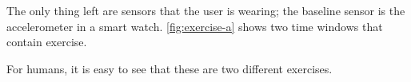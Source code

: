The only thing left are sensors that the user is wearing; the baseline sensor is the accelerometer in a smart watch. \autoref{fig:exercise-a} shows two time windows that contain exercise.


For humans, it is easy to see that these are two different exercises.

\printbibliography

 